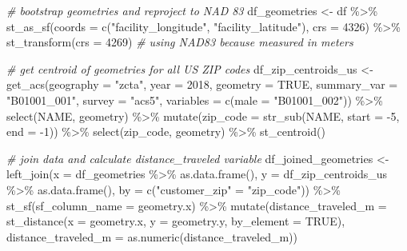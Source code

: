 \documentclass[
]{book}
\newenvironment{Shaded}{\begin{snugshade}}{\end{snugshade}}
\newcommand{\AttributeTok}[1]{\textcolor[rgb]{0.77,0.63,0.00}{#1}}
\newcommand{\CommentTok}[1]{\textcolor[rgb]{0.56,0.35,0.01}{\textit{#1}}}
\newcommand{\ConstantTok}[1]{\textcolor[rgb]{0.00,0.00,0.00}{#1}}
\newcommand{\DecValTok}[1]{\textcolor[rgb]{0.00,0.00,0.81}{#1}}
\newcommand{\FunctionTok}[1]{\textcolor[rgb]{0.00,0.00,0.00}{#1}}
\newcommand{\NormalTok}[1]{#1}
\newcommand{\OtherTok}[1]{\textcolor[rgb]{0.56,0.35,0.01}{#1}}
\newcommand{\SpecialCharTok}[1]{\textcolor[rgb]{0.00,0.00,0.00}{#1}}
\newcommand{\StringTok}[1]{\textcolor[rgb]{0.31,0.60,0.02}{#1}}
\begin{document}
\begin{Shaded}
\begin{Highlighting}[]
\CommentTok{\# bootstrap geometries and reproject to NAD 83}
\NormalTok{df\_geometries }\OtherTok{\textless{}{-}}\NormalTok{ df }\SpecialCharTok{\%\textgreater{}\%} 
  \FunctionTok{st\_as\_sf}\NormalTok{(}\AttributeTok{coords =} \FunctionTok{c}\NormalTok{(}\StringTok{"facility\_longitude"}\NormalTok{, }\StringTok{"facility\_latitude"}\NormalTok{),}
           \AttributeTok{crs =} \DecValTok{4326}\NormalTok{) }\SpecialCharTok{\%\textgreater{}\%} 
  \FunctionTok{st\_transform}\NormalTok{(}\AttributeTok{crs =} \DecValTok{4269}\NormalTok{) }\CommentTok{\# using NAD83 because measured in meters}

\CommentTok{\# get centroid of geometries for all US ZIP codes }
\NormalTok{df\_zip\_centroids\_us }\OtherTok{\textless{}{-}} 
  \FunctionTok{get\_acs}\NormalTok{(}\AttributeTok{geography =} \StringTok{"zcta"}\NormalTok{, }\AttributeTok{year =} \DecValTok{2018}\NormalTok{, }
          \AttributeTok{geometry =} \ConstantTok{TRUE}\NormalTok{, }
          \AttributeTok{summary\_var =} \StringTok{"B01001\_001"}\NormalTok{,}
          \AttributeTok{survey =} \StringTok{"acs5"}\NormalTok{,}
          \AttributeTok{variables =} \FunctionTok{c}\NormalTok{(}\AttributeTok{male =} \StringTok{"B01001\_002"}\NormalTok{)) }\SpecialCharTok{\%\textgreater{}\%} 
  \FunctionTok{select}\NormalTok{(NAME, geometry) }\SpecialCharTok{\%\textgreater{}\%} 
  \FunctionTok{mutate}\NormalTok{(}\AttributeTok{zip\_code =} \FunctionTok{str\_sub}\NormalTok{(NAME, }\AttributeTok{start =} \SpecialCharTok{{-}}\DecValTok{5}\NormalTok{, }\AttributeTok{end =} \SpecialCharTok{{-}}\DecValTok{1}\NormalTok{)) }\SpecialCharTok{\%\textgreater{}\%} 
  \FunctionTok{select}\NormalTok{(zip\_code, geometry) }\SpecialCharTok{\%\textgreater{}\%} 
  \FunctionTok{st\_centroid}\NormalTok{()}

\CommentTok{\# join data and calculate \textasciigrave{}distance\_traveled\textasciigrave{} variable}
\NormalTok{df\_joined\_geometries }\OtherTok{\textless{}{-}} 
  \FunctionTok{left\_join}\NormalTok{(}\AttributeTok{x =}\NormalTok{ df\_geometries }\SpecialCharTok{\%\textgreater{}\%} \FunctionTok{as.data.frame}\NormalTok{(),}
            \AttributeTok{y =}\NormalTok{ df\_zip\_centroids\_us }\SpecialCharTok{\%\textgreater{}\%} \FunctionTok{as.data.frame}\NormalTok{(), }
            \AttributeTok{by =} \FunctionTok{c}\NormalTok{(}\StringTok{"customer\_zip"} \OtherTok{=} \StringTok{"zip\_code"}\NormalTok{)) }\SpecialCharTok{\%\textgreater{}\%}
  \FunctionTok{st\_sf}\NormalTok{(}\AttributeTok{sf\_column\_name =} \StringTok{\textquotesingle{}geometry.x\textquotesingle{}}\NormalTok{) }\SpecialCharTok{\%\textgreater{}\%} 
  \FunctionTok{mutate}\NormalTok{(}\AttributeTok{distance\_traveled\_m =} \FunctionTok{st\_distance}\NormalTok{(}\AttributeTok{x =}\NormalTok{ geometry.x, }
                                           \AttributeTok{y =}\NormalTok{ geometry.y,}
                                           \AttributeTok{by\_element =} \ConstantTok{TRUE}\NormalTok{),}
         \AttributeTok{distance\_traveled\_m =} \FunctionTok{as.numeric}\NormalTok{(distance\_traveled\_m)) }
\end{Highlighting}
\end{Shaded}
\end{document}
